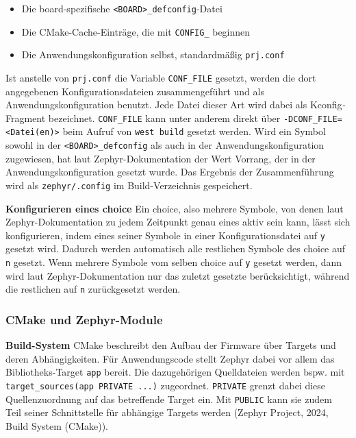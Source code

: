 \begin{itemize}
\item Die board-spezifische \lstinline[style=fileinline]|<BOARD>_defconfig|-Datei
\item Die CMake-Cache-Eintr{\"a}ge, die mit \lstinline[style=fileinline]|CONFIG_| beginnen
\item Die Anwendungskonfiguration selbst, standardm{\"a}{\ss}ig \lstinline[style=fileinline]|prj.conf|
\end{itemize}
Ist anstelle von \lstinline[style=fileinline]|prj.conf| die Variable \lstinline[style=fileinline]|CONF_FILE| gesetzt, werden die dort angegebenen Konfigurationsdateien zusammengef{\"u}hrt und als Anwendungskonfiguration benutzt. Jede Datei dieser Art wird dabei als \glqq{}Kconfig\emph{-}Fragment\grqq{} bezeichnet. \lstinline[style=fileinline]|CONF_FILE| kann unter anderem direkt {\"u}ber \lstinline[style=fileinline]|-DCONF_FILE=<Datei(en)>| beim Aufruf von \lstinline[style=fileinline]|west build| gesetzt werden. Wird ein Symbol sowohl in der \lstinline[style=fileinline]|<BOARD>_defconfig| als auch in der Anwendungskonfiguration zugewiesen, hat laut Zephyr-Dokumentation der  Wert Vorrang, der in der Anwendungskonfiguration gesetzt wurde. Das Ergebnis der Zusammenf{\"u}hrung wird als \lstinline[style=fileinline]|zephyr/.config| im Build-Verzeichnis gespeichert.

\textbf{Konfigurieren eines choice} Ein choice, also mehrere Symbole, von denen laut Zephyr-Dokumentation zu jedem Zeitpunkt genau eines aktiv sein kann, l{\"a}sst sich konfigurieren, indem eines seiner Symbole in einer Konfigurationsdatei auf \lstinline[style=fileinline]|y| gesetzt wird. Dadurch werden automatisch alle restlichen Symbole des choice auf \lstinline[style=fileinline]|n| gesetzt. Wenn mehrere Symbole vom selben choice auf \lstinline[style=fileinline]|y| gesetzt werden, dann wird laut Zephyr-Dokumentation nur das zuletzt gesetzte ber{\"u}cksichtigt, w{\"a}hrend die restlichen auf \lstinline[style=fileinline]|n| zur{\"u}ckgesetzt werden.

\subsubsection{CMake und Zephyr-Module}
\textbf{Build-System} CMake beschreibt den Aufbau der Firmware {\"u}ber Targets und deren Abh{\"a}ngigkeiten. F{\"u}r Anwendungscode stellt Zephyr dabei vor allem das Bibliotheks-Target \lstinline[style=fileinline]|app| bereit. Die dazugeh{\"o}rigen Quelldateien werden bspw. mit \lstinline[style=fileinline]|target_sources(app PRIVATE ...)| zugeordnet. \lstinline[style=fileinline]|PRIVATE| grenzt dabei diese Quellenzuordnung auf das betreffende Target ein. Mit \lstinline[style=fileinline]|PUBLIC| kann sie zudem Teil seiner Schnittstelle f{\"u}r abh{\"a}ngige Targets werden (Zephyr Project, 2024, \glqq{}Build System (CMake)\grqq{}).

